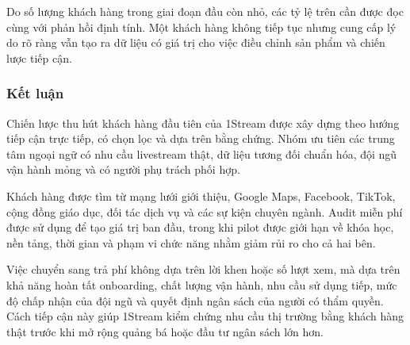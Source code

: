 Do số lượng khách hàng trong giai đoạn đầu còn nhỏ, các tỷ lệ trên cần được đọc cùng với phản hồi định tính. Một khách hàng không tiếp tục nhưng cung cấp lý do rõ ràng vẫn tạo ra dữ liệu có giá trị cho việc điều chỉnh sản phẩm và chiến lược tiếp cận.

\subsubsection{Kết luận}

Chiến lược thu hút khách hàng đầu tiên của 1Stream được xây dựng theo hướng tiếp cận trực tiếp, có chọn lọc và dựa trên bằng chứng. Nhóm ưu tiên các trung tâm ngoại ngữ có nhu cầu livestream thật, dữ liệu tương đối chuẩn hóa, đội ngũ vận hành mỏng và có người phụ trách phối hợp.

Khách hàng được tìm từ mạng lưới giới thiệu, Google Maps, Facebook, TikTok, cộng đồng giáo dục, đối tác dịch vụ và các sự kiện chuyên ngành. Audit miễn phí được sử dụng để tạo giá trị ban đầu, trong khi pilot được giới hạn về khóa học, nền tảng, thời gian và phạm vi chức năng nhằm giảm rủi ro cho cả hai bên.

Việc chuyển sang trả phí không dựa trên lời khen hoặc số lượt xem, mà dựa trên khả năng hoàn tất onboarding, chất lượng vận hành, nhu cầu sử dụng tiếp, mức độ chấp nhận của đội ngũ và quyết định ngân sách của người có thẩm quyền. Cách tiếp cận này giúp 1Stream kiểm chứng nhu cầu thị trường bằng khách hàng thật trước khi mở rộng quảng bá hoặc đầu tư ngân sách lớn hơn.